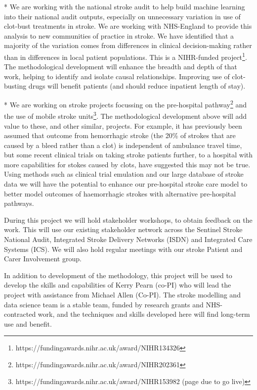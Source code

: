 \begin{markdown}
* We are working with the national stroke audit to help build machine learning into their national audit outputs, especially on unnecessary variation in use of clot-bust treatments in stroke. We are working with NHS-England to provide this analysis to new communities of practice in stroke. We have identified that a majority of the variation comes from differences in clinical decision-making rather than in differences in local patient populations. This is a NIHR-funded project\footnote{https://fundingawards.nihr.ac.uk/award/NIHR134326}. The methodological development will enhance the breadth and depth of that work, helping to identify and isolate causal relationships. Improving use of clot-busting drugs will benefit patients (and should reduce inpatient length of stay).

* We are working on stroke projects focussing on the pre-hospital pathway\footnote{https://fundingawards.nihr.ac.uk/award/NIHR202361} and the use of mobile stroke units\footnote{https://fundingawards.nihr.ac.uk/award/NIHR153982 (page due to go live)}. The methodological development above will add value to these, and other similar, projects. For example, it has previously been assumed that outcome from hemorrhagic stroke (the 20\% of strokes that are caused by a bleed rather than a clot) is independent of ambulance travel time, but some recent clinical trials on taking stroke patients further, to a hospital with more capabilities for stokes caused by clots, have suggested this may not be true. Using methods such as clinical trial emulation and our large database of stroke data we will have the potential to enhance our pre-hospital stroke care model to better model outcomes of haemorrhagic strokes with alternative pre-hospital pathways.

During this project we will hold stakeholder workshops, to obtain feedback on the work. This will use our existing stakeholder network across the Sentinel Stroke National Audit, Integrated Stroke Delivery Networks (ISDN) and Integrated Care Systems (ICS). We will also hold regular meetings with our stroke Patient and Carer Involvement group.

In addition to development of the methodology, this project will be used to develop the skills and capabilities of Kerry Pearn (co-PI) who will lead the project with assistance from Michael Allen (Co-PI). The stroke modelling and data science team is a stable team, funded by research grants and NHS-contracted work, and the techniques and skills developed here will find long-term use and benefit.

\end{markdown}




